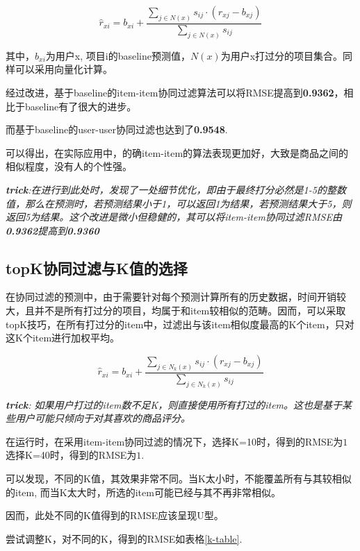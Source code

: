 \documentclass[utf8, a4paper,11pt, onecolumn]{ctexart}
\begin{document}
\begin{spacing}{1.3}
\[\hat{r}_{xi} = b_{xi}  + \frac{\sum_{j \in N(x)} s_{ij} \cdot (r_{xj} - b_{xj})}{\sum_{j \in N(x)} s_{ij}} \]

其中，$b_{xi}$为用户x, 项目i的baseline预测值，$N(x)$为用户x打过分的项目集合。同样可以采用向量化计算。

经过改进，基于baseline的item-item协同过滤算法可以将RMSE提高到\textbf{0.9362}，相比于baseline有了很大的进步。

而基于baseline的user-user协同过滤也达到了\textbf{0.9548}.

可以得出，在实际应用中，的确item-item的算法表现更加好，大致是商品之间的相似程度，没有人的个性强。

\textit{\textbf{trick}:在进行到此处时，发现了一处细节优化，即由于最终打分必然是1-5的整数值，那么在预测时，若预测结果小于1，可以返回1为结果，若预测结果大于5，则返回5为结果。这个改进是微小但稳健的，其可以将item-item协同过滤RMSE由\textbf{0.9362}提高到\textbf{0.9360}}

\subsection{topK协同过滤与K值的选择}

在协同过滤的预测中，由于需要针对每个预测计算所有的历史数据，时间开销较大，且并不是所有打过分的项目，均属于和item较相似的范畴。因而，可以采取topK技巧，在所有打过分的item中，过滤出与该item相似度最高的K个item，只对这K个item进行加权平均。

\[\hat{r}_{xi} = b_{xi}  + \frac{\sum_{j \in N_k(x)} s_{ij} \cdot (r_{xj} - b_{xj})}{\sum_{j \in N_k(x)} s_{ij}} \]

\textit{\textbf{trick}: 如果用户打过的item数不足K，则直接使用所有打过的item。这也是基于某些用户可能只倾向于对其喜欢的商品评分。}

在运行时，在采用item-item协同过滤的情况下，选择K=10时，得到的RMSE为$1$选择K=40时，得到的RMSE为$1$.

可以发现，不同的K值，其效果非常不同。当K太小时，不能覆盖所有与其较相似的item, 而当K太大时，所选的item可能已经与其不再非常相似。

因而，此处不同的K值得到的RMSE应该呈现U型。

尝试调整K，对不同的K，得到的RMSE如表格\ref{k-table}.


\end{spacing}
\end{document}
